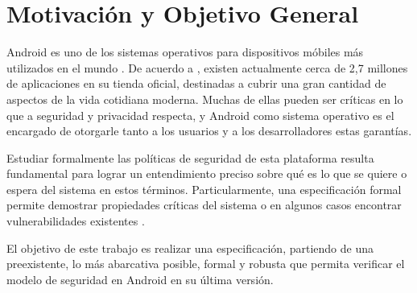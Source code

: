 \section{Motivación y Objetivo General}

Android es uno de los sistemas operativos para dispositivos móbiles más
utilizados en el mundo \cite{1,2}. De acuerdo a \cite{3}, existen actualmente
cerca de 2,7 millones de aplicaciones en su tienda oficial, destinadas a cubrir
una gran cantidad de aspectos de la vida cotidiana moderna. Muchas de ellas
pueden ser críticas en lo que a seguridad y privacidad respecta, y Android como
sistema operativo es el encargado de otorgarle tanto a los usuarios y a los
desarrolladores estas garantías.

Estudiar formalmente las políticas de seguridad de esta plataforma resulta
fundamental para lograr un entendimiento preciso sobre qué es lo que se quiere o
espera del sistema en estos términos. Particularmente, una especificación formal
permite demostrar propiedades críticas del sistema o en algunos casos encontrar
vulnerabilidades existentes \cite{alloy}.

El objetivo de este trabajo es realizar una especificación, partiendo de una
preexistente, lo más abarcativa posible, formal y robusta que permita verificar
el modelo de seguridad en Android en su última versión.
